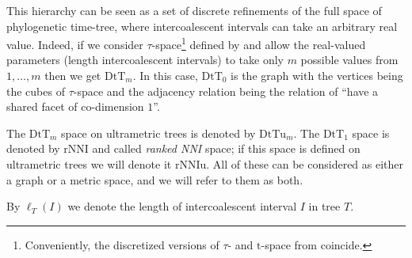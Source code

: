\documentclass{amsart}
\theoremstyle{definition}
\newcommand{\rnni}{\mathrm{rNNI}}
\newcommand{\rnniu}{\mathrm{rNNIu}}
\newcommand{\dtt}{\mathrm{DtT}}
\newcommand{\dttu}{\mathrm{DtTu}}
\begin{document}
This hierarchy can be seen as a set of discrete refinements of the full space of phylogenetic time-tree, where intercoalescent intervals can take an arbitrary real value.
Indeed, if we consider
$\tau$-space\footnote{Conveniently, the discretized versions of $\tau$- and $\mathrm t$-space from \autocite{Gavryushkin2014-bw} coincide.}
defined by \textcite{Gavryushkin2014-bw} and allow the real-valued parameters (length intercoalescent intervals) to take only $m$ possible values from $1,\ldots,m$ then we get $\dtt_m$.
In this case, $\dtt_0$ is the graph with the vertices being the cubes of $\tau$-space and the adjacency relation being the relation of ``have a shared facet of co-dimension $1$''.

The $\dtt_m$ space on ultrametric trees is denoted by $\dttu_m$.
The $\dtt_1$ space is denoted by $\rnni$ and called {\em ranked NNI} space; if this space is defined on ultrametric trees we will denote it $\rnniu$.
All of these can be considered as either a graph or a metric space, and we will refer to them as both.

By $\ell_T(I)$ we denote the length of intercoalescent interval $I$ in tree $T$.
\end{document}
